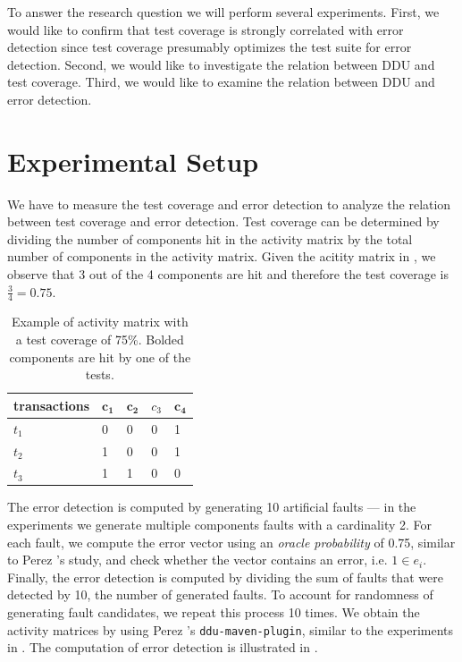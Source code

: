 \documentclass[twoside,a4paper,11pt]{memoir}
\begin{document}
To answer the research question we will perform several experiments.
First, we would like to confirm that test coverage is strongly correlated with error detection since test coverage presumably optimizes the test suite for error detection.
Second, we would like to investigate the relation between DDU and test coverage.
Third, we would like to examine the relation between DDU and error detection.


\section{Experimental Setup}
We have to measure the test coverage and error detection to analyze the relation between test coverage and error detection.
Test coverage can be determined by dividing the number of components hit in the activity matrix by the total number of components in the activity matrix.
Given the acitity matrix in , we observe that 3 out of the 4 components are hit and therefore the test coverage is $\frac{3}{4} = 0.75$.
\begin{table}[]
\centering
\caption{Example of activity matrix with a test coverage of 75\%. Bolded components are hit by one of the tests.}
\label{tab:test_coverage}
\begin{tabular}{l|llll}
transactions & $\mathbf{c_1}$ & $\mathbf{c_2}$ & $c_3$ & $\mathbf{c_4}$ \\ \hline
$t_1$ & 0 & 0 & 0 & 1 \\
$t_2$ & 1 & 0 & 0 & 1 \\
$t_3$ & 1 & 1 & 0 & 0
\end{tabular}
\end{table}
The error detection is computed by generating 10 artificial faults --- in the experiments we generate multiple components faults with a cardinality 2.
For each fault, we compute the error vector using an \emph{oracle probability} of 0.75, similar to Perez \etal's study, and check whether the vector contains an error, i.e. $1 \in e_i$.
Finally, the error detection is computed by dividing the sum of faults that were detected by 10, the number of generated faults.
To account for randomness of generating fault candidates, we repeat this process 10 times.
We obtain the activity matrices by using Perez \etal's \texttt{ddu-maven-plugin}, similar to the experiments in .
The computation of error detection is illustrated in .
\end{document}
